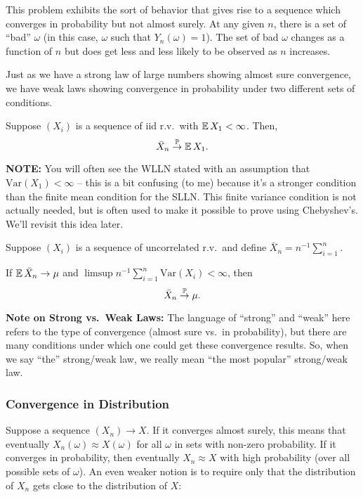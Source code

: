This problem exhibits the sort of behavior that gives rise to a sequence 
which converges in probability but not almost surely. At any given $n$, there 
is a set of ``bad'' $\omega$ (in this case, $\omega$ such that $Y_n(\omega) = 1$).
The set of bad $\omega$ changes as a function of $n$ but does get less and less likely 
to be observed as $n$ increases.

Just as we have a strong law of large numbers showing almost sure convergence, we 
have weak laws showing convergence in probability under two different sets of conditions.

\begin{theorem}
    Suppose $(X_i)$ is a sequence of iid r.v.\ with $\operatorname*{\mathbb{E}} X_1 < \infty$.
    Then,
    \[
        \bar{X}_n \overset{\operatorname*{\mathbb{P}}}{\rightarrow} \operatorname*{\mathbb{E}} X_1.
    \]
\end{theorem}

\textbf{NOTE:} You will often see the WLLN stated with an assumption that 
$\text{Var}(X_1) < \infty$ -- this is a bit confusing (to me) because it's 
a stronger condition than the finite mean condition for the SLLN.
This finite variance condition is not actually needed, but is often used 
to make it possible to prove using Chebyshev's. We'll revisit this idea later.

\begin{theorem}
    \label{thm:wlln}
    Suppose $(X_i)$ is a sequence of uncorrelated r.v.\ and define 
    $\bar{X}_n = n^{-1} \sum_{i=1}^{n}$. 

    If $\operatorname*{\mathbb{E}} \bar{X}_n \rightarrow \mu$ and $\limsup n^{-1} \sum_{i=1}^{n} \text{Var}(X_i) < \infty$,
    then 
    \[
        \bar{X}_n \overset{\operatorname*{\mathbb{P}}}{\rightarrow} \mu.
    \]
\end{theorem}

\textbf{Note on Strong vs.\ Weak Laws:} The language of ``strong'' and ``weak''
here refers to the type of convergence (almost sure vs.\ in probability), 
but there are many conditions under which one could get these convergence results.
So, when we say ``the'' strong/weak law, we really mean ``the most popular''
strong/weak law. 

\subsubsection{Convergence in Distribution}

Suppose a sequence $(X_n) \rightarrow X$. 
If it converges almost surely, this means that eventually $X_n(\omega) \approx X(\omega)$
for all $\omega$ in sets with non-zero probability.
If it converges in probability, then eventually $X_n \approx X$ with high probability 
(over all possible sets of $\omega$). An even weaker notion is to 
require only that the distribution of $X_n$ gets close to the distribution of $X$:

